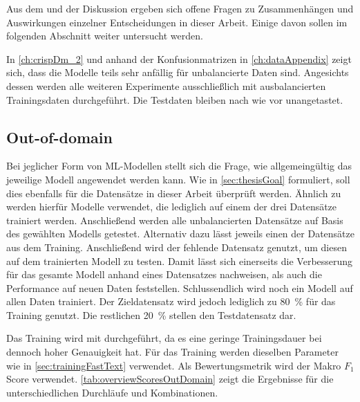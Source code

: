 Aus dem  und der Diskussion ergeben sich offene Fragen zu Zusammenhängen und Auswirkungen einzelner Entscheidungen in dieser Arbeit. Einige davon sollen im folgenden Abschnitt weiter untersucht werden.

In \autoref{ch:crispDm_2} und anhand der Konfusionmatrizen in \autoref{ch:dataAppendix} zeigt sich, dass die Modelle teils sehr anfällig für unbalancierte Daten sind. Angesichts dessen werden alle weiteren Experimente ausschließlich mit ausbalancierten Trainingsdaten durchgeführt. Die Testdaten bleiben nach wie vor unangetastet.

\subsection{Out-of-domain} \label{subsec:outOfDomain}


Bei jeglicher Form von \ac{ML}-Modellen stellt sich die Frage, wie allgemeingültig das jeweilige Modell angewendet werden kann. Wie in \autoref{sec:thesisGoal} formuliert, soll dies ebenfalls für die Datensätze in dieser Arbeit überprüft werden. Ähnlich zu \textcite{biessmann_predicting_2016} werden hierfür Modelle verwendet, die lediglich auf einem der drei Datensätze trainiert werden. Anschließend werden alle unbalancierten Datensätze auf Basis des gewählten Modells getestet. Alternativ dazu lässt \textcite[1631]{guhr_training_2020} jeweils einen der Datensätze aus dem Training. Anschließend wird der fehlende Datensatz genutzt, um diesen auf dem trainierten Modell zu testen. Damit lässt sich einerseits die Verbesserung für das gesamte Modell anhand eines Datensatzes nachweisen, als auch die Performance auf neuen Daten feststellen. Schlussendlich wird noch ein Modell auf allen Daten trainiert. Der Zieldatensatz wird jedoch lediglich zu \SI{80}{\percent} für das Training genutzt. Die restlichen \SI{20}{\percent} stellen den Testdatensatz dar.

Das Training wird mit \ft durchgeführt, da es eine geringe Trainingsdauer bei dennoch hoher Genauigkeit hat. Für das Training werden dieselben Parameter wie in \autoref{sec:trainingFastText} verwendet. Als Bewertungsmetrik wird der Makro \(F_{1}\) Score verwendet. \autoref{tab:overviewScoresOutDomain} zeigt die Ergebnisse für die unterschiedlichen Durchläufe und Kombinationen.

